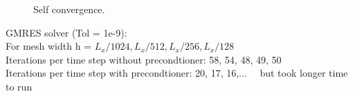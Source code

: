 \documentclass[a4paper,12pt]{article}
\begin{document}
\begin{figure}[!ht]
     \hfill
     \caption{Self convergence. }
     \label{fig:nolat_convergence}
   \end{figure}
GMRES solver (Tol = 1e-9):\\
For mesh width h =  $ L_x/1024, L_x/512, L_x/256, L_x/128 $\\
Iterations per time step without precondtioner: 58, 54, 48, 49, 50\\
Iterations per time step with precondtioner: 20, 17, 16,...      \ \        but took longer time to run

\newpage
\end{document}
